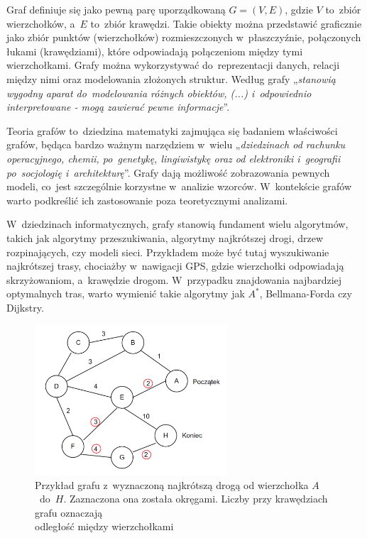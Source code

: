 Graf definiuje się jako pewną parę uporządkowaną $G = (V, E)$, gdzie $V$ to~zbiór wierzchołków,
a~$E$ to~zbiór krawędzi.
Takie obiekty można przedstawić graficznie jako zbiór punktów (wierzchołków) rozmieszczonych w~płaszczyźnie,
połączonych łukami (krawędziami), które odpowiadają połączeniom między tymi wierzchołkami.
Grafy można wykorzystywać do~reprezentacji danych, relacji między nimi oraz modelowania złożonych struktur.
Według \cite{Wloch2008} grafy „\textit{stanowią wygodny aparat do~modelowania różnych obiektów, (...) i~odpowiednio interpretowane
- mogą zawierać pewne informacje}”.

Teoria grafów to~dziedzina matematyki zajmująca się badaniem właściwości grafów,
będąca bardzo ważnym narzędziem w~wielu „\textit{dziedzinach od rachunku operacyjnego, chemii, po~genetykę, lingiwistykę
oraz od elektroniki i~geografii po~socjologię i~architekturę}”\cite{Wilson2012}.
Grafy dają możliwość zobrazowania pewnych modeli, co~jest szczególnie korzystne w~analizie wzorców.
W~kontekście grafów warto podkreślić ich zastosowanie poza teoretycznymi analizami.

W~dziedzinach informatycznych, grafy stanowią fundament wielu algorytmów, takich jak algorytmy przeszukiwania,
algorytmy najkrótszej drogi, drzew rozpinających, czy modeli sieci.
Przykładem może być tutaj wyszukiwanie najkrótszej trasy, chociażby w~nawigacji GPS,
gdzie wierzchołki odpowiadają skrzyżowaniom, a~krawędzie drogom.
W~przypadku znajdowania najbardziej optymalnych tras, warto wymienić takie algorytmy jak $A^*$, Bellmana-Forda czy Dijkstry.

\begin{figure}[ht]
	\centering
	\includegraphics[height=5.6cm]{resources/introduction/images/shortest_path.png}
	\caption{Przykład grafu z~wyznaczoną najkrótszą drogą od wierzchołka $A$~do~$H$.
		Zaznaczona ona została okręgami.
		Liczby przy krawędziach grafu oznaczają \\ odległość między wierzchołkami}
    \label{Fig:intro-1}
\end{figure}
\FloatBarrier

